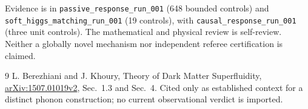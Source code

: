 \documentclass[11pt]{article}
\begin{document}
Evidence is in \texttt{passive\_response\_run\_001} (648 bounded controls)
and \texttt{soft\_higgs\_matching\_run\_001} (19 controls), with
\texttt{causal\_response\_run\_001} (three unit controls).
The mathematical and physical review is self-review. Neither a globally
novel mechanism nor independent referee
certification is claimed.

\begin{thebibliography}{9}
 L. Berezhiani and J. Khoury,
Theory of Dark Matter Superfluidity,
\href{https://arxiv.org/html/1507.01019v2}{arXiv:1507.01019v2},
Sec.~1.3 and Sec.~4. Cited only as established context for a distinct
phonon construction; no current observational verdict is imported.
\end{thebibliography}
\end{document}
